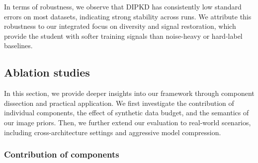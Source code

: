 \begin{foldable}
  In terms of robustness, we observe that \ac{DIPKD} has consistently low standard errors on most datasets, indicating strong stability across runs.
  We attribute this robustness to our integrated focus on diversity and signal restoration, which provide the student with softer training signals than noise-heavy or hard-label baselines.
\end{foldable}

\subsection{Ablation studies} \label{sec:44-research02-experiments-abla}
\begin{foldable}
  In this section, we provide deeper insights into our framework through component dissection and practical application.
  We first investigate the contribution of individual components, the effect of synthetic data budget, and the semantics of our image priors.
  Then, we further extend our evaluation to real-world scenarios, including cross-architecture settings and aggressive model compression.
\end{foldable}

\subsubsection{Contribution of components} \label{sec:44-research02-experiments-abla-components}

